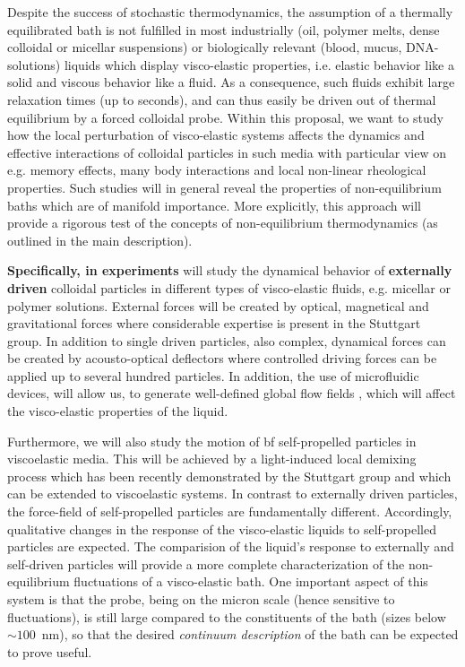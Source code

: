 \begin{workpackage}
\begin{wpdescription}
Despite the success of stochastic thermodynamics, the assumption of a thermally equilibrated bath is not fulfilled in most industrially (oil, polymer melts, dense colloidal or micellar suspensions) or biologically relevant (blood, mucus, DNA-solutions) liquids which display visco-elastic properties, i.e. elastic behavior like a solid and viscous
behavior like a fluid. As a consequence, such
fluids exhibit large relaxation times (up to seconds), and can thus easily be driven
out of thermal equilibrium by a forced colloidal probe. Within this proposal, we want to study how the local perturbation of visco-elastic systems affects the dynamics and effective interactions of colloidal particles in such media with particular view on e.g. memory effects, many body interactions and local non-linear rheological properties. Such studies will in general reveal the
properties of non-equilibrium baths which are of manifold importance. More explicitly, this approach will provide a rigorous test of the concepts of non-equilibrium thermodynamics (as outlined in the main
description).


{\bf Specifically, in experiments} will study the dynamical behavior of {\bf externally driven} colloidal particles in different types of visco-elastic
fluids, e.g. micellar or polymer solutions. External forces will be created by optical, magnetical and gravitational forces where considerable expertise is present in the Stuttgart group. In addition to single driven particles, also complex, dynamical forces can be created by acousto-optical deflectors where controlled driving forces can be applied up to several hundred particles. In addition, the use of microfluidic devices, will allow us, to generate well-defined global flow fields \cite{scholz2012}, which will affect the visco-elastic properties of the liquid.

Furthermore, we will also study the motion of {bf self-propelled particles} in viscoelastic media. This will be achieved by a light-induced local demixing process which has been recently demonstrated by the Stuttgart group \cite{kuemmel2013, buttinoni2013, tenHagen2014} and which can be extended to viscoelastic systems. In contrast to externally driven particles, the force-field of self-propelled particles are fundamentally different. Accordingly, qualitative changes in the response of the visco-elastic liquids to self-propelled particles are expected. The comparision of the liquid's response to externally and self-driven particles will provide a more complete characterization of the
non-equilibrium fluctuations of a visco-elastic bath. One important aspect of this system is that the
probe, being on the micron scale (hence sensitive to fluctuations), is still large compared
to the constituents of the bath (sizes below $\sim 100$~nm), so that the desired {\it
  continuum description} of the bath can be expected to prove useful.


\end{wpdescription}
\end{workpackage}
